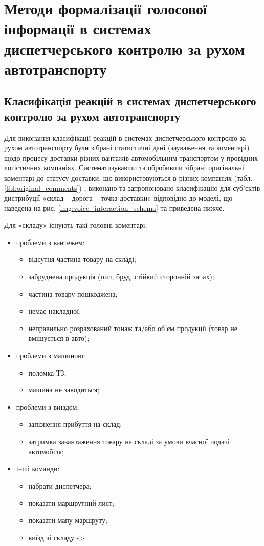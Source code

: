 \chapter{Методи формалізації голосової інформації в системах диспетчерського контролю за рухом автотранспорту} \label{chapt3}

\section{Класифікація реакцій в системах диспетчерського контролю за рухом автотранспорту} \label{sect3_1}

Для виконання класифікації реакцій в системах диспетчерського контролю за рухом автотранспорту були зібрані статистичні дані (зауваження та коментарі) щодо процесу доставки різних вантажів автомобільним транспортом у провідних логістичних компаніях. Систематизувавши та обробивши зібрані оригінальні коментарі до статусу доставки, що використовуються в різних компаніях (табл. \ref{tbl:original_comments}) , виконано та запропоновано класифікацію для суб’єктів дистрибуції «склад – дорога – точка доставки» відповідно до моделі, що наведена на рис. \ref{img:voice_interaction_schema} та приведена нижче.

Для «складу» існують такі головні коментарі:
\begin{itemize}
	\item проблеми з вантежем:
	\begin{itemize}
		\item відсутня частина товару на складі;
		\item забруднена продукція (пил, бруд, стійкий сторонній запах);
		\item частина товару пошкоджена;
		\item немає накладної;
		\item неправильно розрахований тонаж та/або об’єм продукції (товар не вміщується в авто);
	\end{itemize}
	\item проблеми з машиною:
	\begin{itemize}
		\item поломка ТЗ;
		\item машина не заводиться;
	\end{itemize}
	\item проблеми з виїздом:
	\begin{itemize}
		\item запізнення прибуття на склад;
		\item затримка завантаження товару на складі за умови вчасної подачі автомобіля;
	\end{itemize}
	\item інші команди:
	\begin{itemize}
		\item набрати диспетчера;
		\item показати маршрутний лист;
		\item показати мапу маршруту;
		\item виїзд зі складу ->
	\end{itemize}
\end{itemize}

